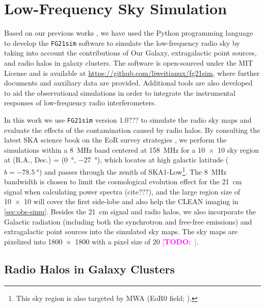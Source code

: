 \documentclass[modern]{aastex61}
\newcommand{\TODO}[1]{\textcolor{magenta}{[\textbf{TODO:}~\uuline{#1}]}}
\begin{document}
\section{Low-Frequency Sky Simulation}
\label{sec:sky-simu}

Based on our previous works \citep{wang2010,wang2013}, we have used the
Python programming language to develop the \texttt{FG21sim} software to
simulate the low-frequency radio sky by taking into account the
contributions of Our Galaxy, extragalactic point sources, and radio halos
in galaxy clusters.
The software is open-sourced under the MIT License and is available at
\url{https://github.com/liweitianux/fg21sim},
where further documents and auxiliary data are provided.
Additional tools are also developed to aid the observational simulations
in order to integrate the instrumental responses of low-frequency radio
interferometers.

In this work we use \texttt{FG21sim} version 1.0??? to simulate the
radio sky maps and evaluate the effects of the contamination caused by
radio halos.
By consulting the latest SKA science book on the EoR survey strategies
\citep[e.g.,][]{koopmans2015rev}, we perform the simulations within
a \SI{8}{\MHz} band centered at \SI{158}{\MHz} for a \SI{10 x 10}{\deg}
sky region at (R.A., Dec.) = (\SI{0}{\degree}, \SI{-27}{\degree}),
which locates at high galactic latitude ($b = \SI{-78.5}{\degree}$)
and passes through the zenith of SKA1-Low\footnote{This sky region
  is also targeted by MWA (EoR0 field; \citealt{beardsley2016}).}.
The \SI{8}{\MHz} bandwidth is chosen to limit the cosmological evolution
effect for the 21~cm signal when calculating power spectra (cite???),
and the large region size of \SI{10 x 10}{\deg} will cover the first
side-lobe and also help the CLEAN imaging in \autoref{sec:obs-simu}.
Besides the 21~cm signal and radio halos, we also incorporate the
Galactic radiation (including both the synchrotron and free-free emissions)
and extragalactic point sources into the simulated sky maps.
The sky maps are pixelized into \num{1800 x 1800} with a pixel size of
\SI{20}{\arcsec} \TODO{improve to 10 arcsec/pixel???}.


\subsection{Radio Halos in Galaxy Clusters}
\label{sec:cluster-halo}
\end{document}
